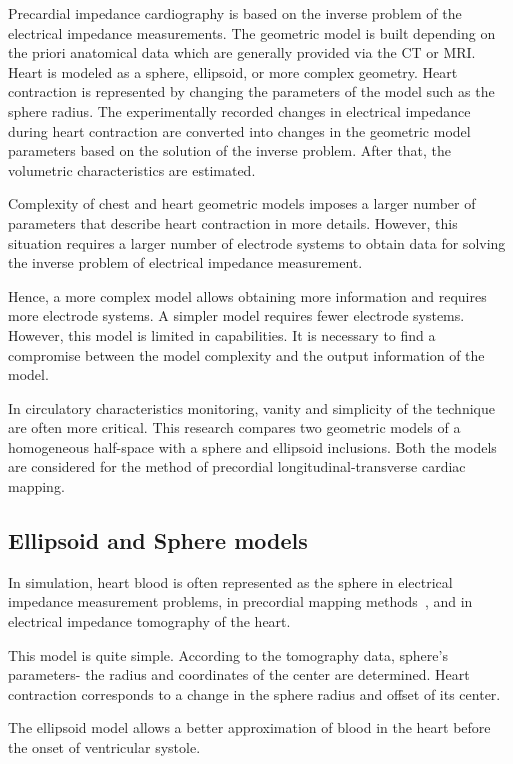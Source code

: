 \documentclass[conference]{IEEEtran}
\begin{document}
Precardial impedance cardiography is based on the inverse problem of the electrical impedance measurements.
The geometric model is built depending on the priori anatomical data which are generally provided via the CT or MRI.
Heart is modeled as a sphere, ellipsoid, or more complex geometry.
Heart contraction is represented by changing the parameters of the model such as the sphere radius.
The experimentally recorded changes in electrical impedance during heart contraction are converted into changes in the geometric model parameters based on the solution of the inverse problem.
After that, the volumetric characteristics are estimated.

Complexity of chest and heart geometric models imposes a larger number of parameters that describe heart contraction in more details.
However, this situation requires a larger number of electrode systems to obtain data for solving the inverse problem of electrical impedance measurement.

Hence, a more complex model allows obtaining more information and requires more electrode systems.
A simpler model requires fewer electrode systems.
However, this model is limited in capabilities.
It is necessary to find a compromise between the model complexity and the output information of the model.

In circulatory characteristics monitoring, vanity and simplicity of the technique are often more critical.
This research compares two geometric models of a homogeneous half-space with a sphere and ellipsoid inclusions.
Both the models are considered for the method of precordial longitudinal-transverse cardiac mapping.

\subsection{Ellipsoid and Sphere models}

In simulation, heart blood is often represented as the sphere in electrical impedance measurement problems, in precordial mapping methods~\cite{Tikhomirov2019}, and in electrical impedance tomography of the heart.

This model is quite simple.
According to the tomography data, sphere’s parameters- the radius and coordinates of the center are determined.
Heart contraction corresponds to a change in the sphere radius and offset of its center.

The ellipsoid model allows a better approximation of blood in the heart before the onset of ventricular systole.
\end{document}
